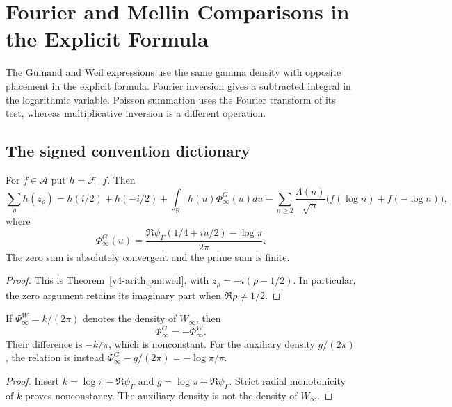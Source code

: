 \chapter{Fourier and Mellin Comparisons in the Explicit Formula}
\label{v4-arith:w7-i:chapter}

The Guinand and Weil expressions use the same gamma density with
opposite placement in the explicit formula. Fourier inversion gives
a subtracted integral in the logarithmic variable. Poisson summation
uses the Fourier transform of its test, whereas multiplicative
inversion is a different operation.

\section{The signed convention dictionary}
\begin{theorem}
\label{v4-arith:w7-i:thm:guinand-explicit}
For $f\in\mathscr A$ put $h=\mathcal F_+f$. Then
\[
 \sum_\rho h(z_\rho)=h(i/2)+h(-i/2)
       +\int_{\mathbb R}h(u)\Phi_\infty^G(u)du
       -\sum_{n\ge2}\frac{\Lambda(n)}{\sqrt n}
          \bigl(f(\log n)+f(-\log n)\bigr),
\]
where
\[
 \Phi_\infty^G(u)=\frac{\Re\psi_\Gamma(1/4+iu/2)-\log\pi}{2\pi}.
\]
The zero sum is absolutely convergent and the prime sum is finite.
\end{theorem}
\begin{proof}
This is Theorem~\ref{v4-arith:pm:weil}, with
$z_\rho=-i(\rho-1/2)$. In particular, the zero argument retains
its imaginary part when $\Re\rho\ne1/2$.
\end{proof}

\begin{proposition}
\label{v4-arith:w7-i:prop:weil-vs-guinand}
If $\Phi_\infty^W=k/(2\pi)$ denotes the density of $W_\infty$, then
\[
 \Phi_\infty^G=-\Phi_\infty^W.
\]
Their difference is $-k/\pi$, which is nonconstant.
For the auxiliary density $g/(2\pi)$, the relation is instead
$\Phi_\infty^G-g/(2\pi)=-\log\pi/\pi$.
\end{proposition}
\begin{proof}
Insert $k=\log\pi-\Re\psi_\Gamma$ and
$g=\log\pi+\Re\psi_\Gamma$. Strict radial monotonicity of $k$
proves nonconstancy. The auxiliary density is not the density of
$W_\infty$.
\end{proof}

